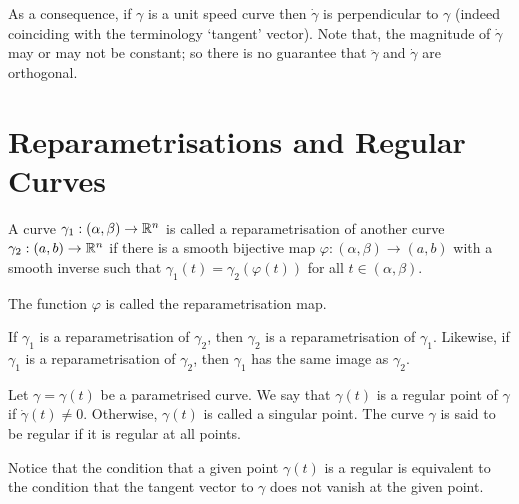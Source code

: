 \documentclass[11pt]{penrose}
\newcommand{\keyword}[1]{\textsf{#1}}
\begin{document}
As a consequence, if $\gamma$ is a unit speed curve then $\dot{\gamma}$ is perpendicular to $\gamma$ (indeed coinciding with the terminology `tangent' vector). Note that, the magnitude of $\dot{\gamma}$ may or may not be constant; so there is no guarantee that $\ddot{\gamma}$ and $\dot{\gamma}$ are orthogonal.

\section{Reparametrisations and Regular Curves}
\begin{ndfn}
    A curve $\gamma_1 : (\alpha, \beta) \to \mathbb{R}^n$ is called a \keyword{reparametrisation} of another curve $\gamma_2 : (a, b) \to \mathbb{R}^n$ if there is a smooth bijective map $\varphi : (\alpha, \beta) \to (a, b)$ with a smooth inverse such that $\gamma_1(t) = \gamma_2( \varphi(t) )$ for all $t \in (\alpha, \beta)$.
\end{ndfn}

The function $\varphi$ is called the \keyword{reparametrisation map}.

If $\gamma_1$ is a reparametrisation of $\gamma_2$, then $\gamma_2$ is a reparametrisation of $\gamma_1$. Likewise, if $\gamma_1$ is a reparametrisation of $\gamma_2$, then $\gamma_1$ has the same image as $\gamma_2$.

\begin{ndfn}
    Let $\gamma = \gamma(t)$ be a parametrised curve. We say that $\gamma(t)$ is a \keyword{regular} point of $\gamma$ if $\dot{\gamma}(t) \neq 0$. Otherwise, $\gamma(t)$ is called a \keyword{singular} point. The curve $\gamma$ is said to be regular if it is regular at all points.
\end{ndfn}

Notice that the condition that a given point $\gamma(t)$ is a regular is equivalent to the condition that the tangent vector to $\gamma$ does not vanish at the given point.
\end{document}
